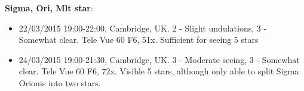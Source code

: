 {\bf Sigma, Ori, Mlt star}:
\begin{itemize}
\item 22/03/2015 19:00-22:00, Cambridge, UK. 2 - Slight undulations, 3 - Somewhat clear. Tele Vue 60 F6, 51x. Sufficient for seeing 5 stars
\item 24/03/2015 19:00-21:30, Cambridge, UK. 3 - Moderate seeing, 3 - Somewhat clear. Tele Vue 60 F6, 72x. Visible 5 stars, although only able to split Sigma Orionis into two stars.
\end{itemize}
